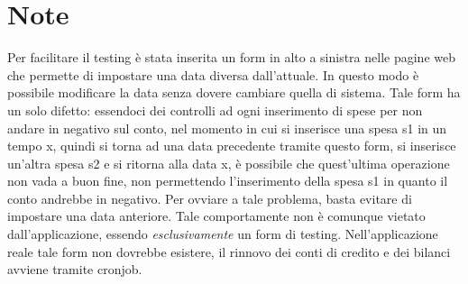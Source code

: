 \documentclass[a4paper,10pt]{article}
\begin{document}
\section{Note}
Per facilitare il testing è stata inserita un form in alto a sinistra nelle pagine web che permette di impostare una data diversa dall'attuale. In questo modo è possibile modificare la data senza dovere cambiare quella di sistema. Tale form ha un solo difetto: essendoci dei controlli ad ogni inserimento di spese per non andare in negativo sul conto, nel momento in cui si inserisce una spesa s1 in un tempo x, quindi si torna ad una data precedente tramite questo form, si inserisce un'altra spesa s2 e si ritorna alla data x, è possibile che quest'ultima operazione non vada a buon fine, non permettendo l'inserimento della spesa s1 in quanto il conto andrebbe in negativo. Per ovviare a tale problema, basta evitare di impostare una data anteriore. Tale comportamente non è comunque vietato dall'applicazione, essendo \emph{esclusivamente} un form di testing. Nell'applicazione reale tale form non dovrebbe esistere, il rinnovo dei conti di credito e dei bilanci avviene tramite cronjob.
\end{document}
